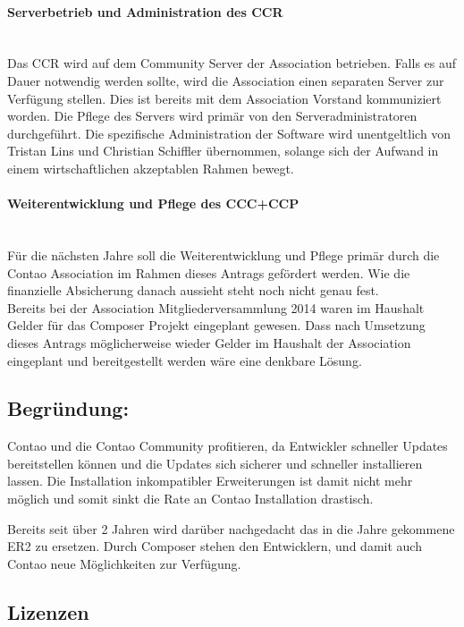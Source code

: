 \documentclass[
paper=a4,
draft=false,%
fontsize=10pt%
]{scrartcl}
\begin{document}
\paragraph{Serverbetrieb und Administration des CCR} ~\\
Das CCR wird auf dem Community Server der Association betrieben. Falls es auf Dauer notwendig werden sollte, wird die Association einen separaten Server zur Verfügung stellen. Dies ist bereits mit dem Association Vorstand kommuniziert worden.
Die Pflege des Servers wird primär von den Serveradministratoren durchgeführt. Die spezifische Administration der Software wird unentgeltlich von Tristan Lins und Christian Schiffler übernommen, solange sich der Aufwand in einem wirtschaftlichen akzeptablen Rahmen bewegt.

\paragraph{Weiterentwicklung und Pflege des CCC+CCP} ~\\
Für die nächsten Jahre soll die Weiterentwicklung und Pflege primär durch die Contao Association im Rahmen dieses Antrags gefördert werden. Wie die finanzielle Absicherung danach aussieht steht noch nicht genau fest.\\
Bereits bei der Association Mitgliederversammlung 2014 waren im Haushalt Gelder für das Composer Projekt eingeplant gewesen. Dass nach Umsetzung dieses Antrags möglicherweise wieder Gelder im Haushalt der Association eingeplant und bereitgestellt werden wäre eine denkbare Lösung.

\subsection{Begründung: }

Contao und die Contao Community profitieren, da Entwickler schneller Updates bereitstellen können und die Updates sich sicherer und schneller installieren lassen. Die Installation inkompatibler Erweiterungen ist damit nicht mehr möglich und somit sinkt die Rate an  Contao Installation drastisch.

Bereits seit über 2 Jahren wird darüber nachgedacht das in die Jahre gekommene ER2 zu ersetzen. Durch Composer stehen den Entwicklern, und damit auch Contao neue Möglichkeiten zur Verfügung.

\subsection{Lizenzen}
\end{document}
